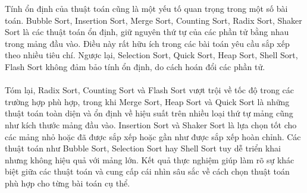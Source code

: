 \pagebreak

Tính ổn định của thuật toán cũng là một yếu tố quan trọng trong một số 
bài toán. Bubble Sort, Insertion Sort, Merge Sort, Counting Sort, Radix 
Sort, Shaker Sort là các thuật toán ổn định, giữ nguyên thứ tự của các 
phần tử bằng nhau trong mảng đầu vào. Điều này rất hữu ích trong các bài 
toán yêu cầu sắp xếp theo nhiều tiêu chí. Ngược lại, Selection Sort, Quick 
Sort, Heap Sort, Shell Sort, Flash Sort không đảm bảo tính ổn định, do 
cách hoán đổi các phần tử. 
\\\\
Tóm lại, Radix Sort, Counting Sort và Flash Sort vượt trội về tốc độ 
trong các trường hợp phù hợp, trong khi Merge Sort, Heap Sort và Quick 
Sort là những thuật toán toàn diện và ổn định về hiệu suất trên nhiều 
loại thứ tự mảng cũng như kích thước mảng đầu vào. Insertion Sort và 
Shaker Sort là lựa chọn tốt cho các mảng nhỏ hoặc đã được sắp xếp hoặc 
gần như được sắp xếp hoàn chỉnh. Các thuật toán như Bubble Sort, Selection 
Sort hay Shell Sort tuy dễ triển khai nhưng không hiệu quả với mảng lớn. 
Kết quả thực nghiệm giúp làm rõ sự khác biệt giữa các thuật toán và cung cấp 
cái nhìn sâu sắc về cách chọn thuật toán phù hợp cho từng bài toán cụ thể. 